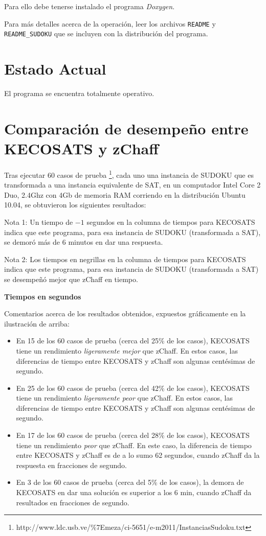 \documentclass[12pt,lettersize,oneside]{article}
\begin{document}
Para ello debe tenerse instalado el programa \emph{Doxygen}.

Para más detalles acerca de la operación, leer los archivos {\tt README} y {\tt
  README\_SUDOKU} que se incluyen con la distribución del programa.
\section{Estado Actual}
El programa se encuentra totalmente operativo.

\section{Comparación de desempeño entre KECOSATS y zChaff}

Tras ejecutar $60$ casos de prueba
\footnote{http://www.ldc.usb.ve/\%7Emeza/ci-5651/e-m2011/InstanciasSudoku.txt},
cada uno una instancia de SUDOKU que es transformada a una instancia equivalente
de SAT, en un computador Intel Core 2 Duo, 2.4Ghz con 4Gb de memoria RAM
corriendo en la distribución Ubuntu 10.04, se
obtuvieron los siguientes resultados:

Nota 1: Un tiempo de $-1$ segundos en la columna de tiempos para KECOSATS indica que
este programa, para esa instancia de SUDOKU (transformada a SAT), se demoró más
de $6$ minutos en dar una respuesta.

Nota 2: Los tiempos en negrillas en la columna de tiempos para KECOSATS indica
que este programa, para esa instancia de SUDOKU (transformada a SAT) se
desempeñó mejor que zChaff en tiempo.

\begin{center}\textbf{ Tiempos en segundos}\end{center}\vspace{-2.5mm}



Comentarios acerca de los resultados obtenidos, expuestos gráficamente en la
ilustración de arriba:\vspace{-2.5mm}
\begin{itemize}
\item En 15 de los 60 casos de prueba (cerca del 25\% de los casos), KECOSATS
  tiene un rendimiento \emph{ligeramente mejor} que zChaff. En estos casos, las
  diferencias de tiempo entre KECOSATS y zChaff son algunas centésimas de
  segundo.
\item En 25 de los 60 casos de prueba (cerca del 42\% de los casos), KECOSATS
  tiene un rendimiento \emph{ligeramente peor} que zChaff. En estos casos, las
  diferencias de tiempo entre KECOSATS y zChaff son algunas centésimas de
  segundo.
\item En 17 de los 60 casos de prueba (cerca del 28\% de los casos), KECOSATS
  tiene un rendimiento \emph{peor} que zChaff. En este caso, la diferencia de
  tiempo entre KECOSATS y zChaff es de a lo sumo 62 segundos, cuando zChaff da la
  respuesta en fracciones de segundo.
\item En 3 de los 60 casos de prueba (cerca del 5\% de los casos), la demora
  de KECOSATS en dar una solución es superior a los 6 min, cuando zChaff da
  resultados en fracciones de segundo.
\end{itemize}
\end{document}
